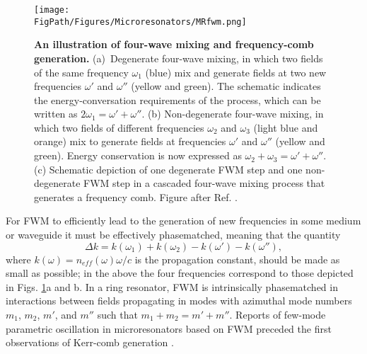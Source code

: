 

\begin{figure}[htpb]
	\begin{center}
		\texttt{[image: \\FigPath/Figures/Microresonators/MRfwm.png]}
	\end{center}
	\caption[An illustration of four-wave mixing and frequency-comb generation.]{\textbf{An illustration of four-wave mixing and frequency-comb generation.} (a)~Degenerate four-wave mixing, in which two fields of the same frequency $\omega_1$ (blue) mix and generate fields at two new frequencies $\omega'$ and $\omega''$ (yellow and green). The schematic indicates the energy-conversation requirements of the process, which can be written as $2\omega_1=\omega'+\omega''$. (b) Non-degenerate four-wave mixing, in which two fields of different frequencies $\omega_2$ and $\omega_3$ (light blue and orange) mix to generate fields at frequencies $\omega'$ and $\omega''$ (yellow and green). Energy conservation is now expressed as $\omega_2+\omega_3=\omega'+\omega''$. (c) Schematic depiction of one degenerate FWM step and one non-degenerate FWM step in a cascaded four-wave mixing process that generates a frequency comb. \footnotesize{Figure after Ref. \cite{Kippenberg2011}.}}
	
	\label{fig:MRfwm}
\end{figure} 

For FWM to efficiently lead to the generation of new frequencies in some medium or waveguide it must be effectively phasematched, meaning that the quantity
\begin{equation}
\Delta k=k(\omega_1)+k(\omega_2)-k(\omega')-k(\omega''),
\end{equation}
where $k(\omega)=n_{eff}(\omega)\omega/c$ is the propagation constant, should be made as small as possible; in the above the four frequencies correspond to those depicted in Figs. \ref{fig:MRfwm}a and b. In a ring resonator, FWM is intrinsically phasematched in interactions between fields propagating in modes with azimuthal mode numbers $m_1$, $m_2$, $m'$, and $m''$ such that $m_1+m_2=m'+m''$. Reports of few-mode parametric oscillation in microresonators based on FWM preceded the first observations of Kerr-comb generation \cite{Kippenberg2004, Savchenkov2004,Agha2007}.




